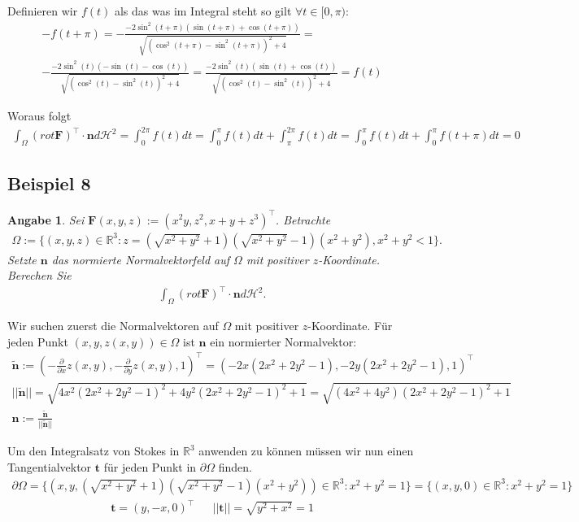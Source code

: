 \documentclass[]{article}
\newtheorem*{angabe*}{Angabe}
\begin{document}
Definieren wir $f(t)$ als das was im Integral steht so gilt $\forall t \in [0, \pi):$
\begin{align*}
	-f(t+\pi) = -\frac{-2\sin^2(t+\pi) (\sin(t+\pi)+\cos(t+\pi))}{\sqrt{(\cos^2(t+\pi)-\sin^2(t+\pi))^2 + 4}} =\\
	-\frac{-2\sin^2(t) (-\sin(t)-\cos(t))}{\sqrt{(\cos^2(t)-\sin^2(t))^2 + 4}} =
	\frac{-2\sin^2(t) (\sin(t)+\cos(t))}{\sqrt{(\cos^2(t)-\sin^2(t))^2 + 4}} = f(t)
\end{align*}

Woraus folgt
\begin{align*}
	\int_\Omega (rot \bm{F})^\top \cdot \bm{n} d\mathcal{H}^2 = \int_0^{2\pi} f(t) dt = \int_0^{\pi} f(t) dt + \int_\pi^{2\pi} f(t) dt = \int_0^{\pi} f(t) dt + \int_0^{\pi} f(t+\pi) dt = 0
\end{align*}

\newpage

\subsection*{Beispiel 8}
\begin{angabe*}
	Sei $\bm{F}(x,y,z):=(x^2y, z^2, x+y+z^3)^\top$. Betrachte
	\begin{align*}
		\Omega := \{(x,y,z) \in \mathbb{R}^3: z=(\sqrt{x^2+y^2}+1)(\sqrt{x^2+y^2}-1)(x^2+y^2), x^2+y^2 < 1\}.
	\end{align*}
	Setzte $\bm{n}$ das normierte Normalvektorfeld auf $\Omega$ mit positiver $z$-Koordinate. Berechen Sie
	\begin{align*}
		\int_\Omega (rot \bm{F})^\top \cdot \bm{n} d\mathcal{H}^2.
	\end{align*}
\end{angabe*}

Wir suchen zuerst die Normalvektoren auf $\Omega$ mit positiver $z$-Koordinate. Für jeden Punkt $(x,y,z(x,y)) \in \Omega$ ist $\bm{n}$ ein normierter Normalvektor:
\begin{align*}
	\tilde{\bm{n}} := \left(-\frac{\partial}{\partial x} z(x,y), -\frac{\partial}{\partial y} z(x,y), 1\right)^\top = (-2x(2x^2+2y^2-1), -2y(2x^2+2y^2-1), 1)^\top\\
	||\tilde{\bm{n}}|| = \sqrt{4x^2(2x^2+2y^2-1)^2 + 4y^2(2x^2+2y^2-1)^2 + 1} = \sqrt{(4x^2+4y^2)(2x^2+2y^2-1)^2+1}\\
	\bm{n}:= \frac{\tilde{\bm{n}}}{||\tilde{\bm{n}}||}
\end{align*}

Um den Integralsatz von Stokes in $\mathbb{R}^3$ anwenden zu können müssen wir nun einen Tangentialvektor $\bm{t}$ für jeden Punkt in $\partial\Omega$ finden.
\begin{align*}
	\partial\Omega = \{(x,y,(\sqrt{x^2+y^2}+1)(\sqrt{x^2+y^2}-1)(x^2+y^2)) \in \mathbb{R}^3: x^2+y^2=1\} = \{(x,y,0) \in \mathbb{R}^3: x^2+y^2=1\}
\end{align*}
\begin{align*}
	\bm{t} = (y, -x, 0)^\top && ||\bm{t}|| = \sqrt{y^2+x^2} = 1\\
\end{align*}
\end{document}
